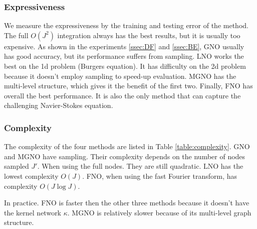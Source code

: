 \subsubsection{Expressiveness}
We measure the expressiveness by the training and testing error of the method. The full $O(J^2)$ integration always has the best results, but it is usually too expensive. As shown in the experiments \ref{ssec:DF} and \ref{ssec:BE}, GNO usually has good accuracy, but its performance suffers from sampling.
LNO works the best on the 1d problem (Burgers equation). It has difficulty on the 2d problem because it doesn't employ sampling
to speed-up evaluation. MGNO has the multi-level structure, which gives it the benefit of the first two. Finally, FNO has overall the best performance. It is also the only method that can capture the challenging Navier-Stokes equation.



\subsubsection{Complexity}
The complexity of the four methods are listed in Table \ref{table:complexity}. GNO and MGNO have sampling. Their complexity depends on the number of nodes sampled $J'$. When using the full nodes. They are still quadratic. LNO has the lowest complexity $O(J)$. FNO, when using the fast Fourier transform, has complexity $O(J \log J)$.

In practice. FNO is faster then the other three methods because it doesn't have the kernel network $\kappa$. MGNO is relatively slower because of its multi-level graph structure. 


